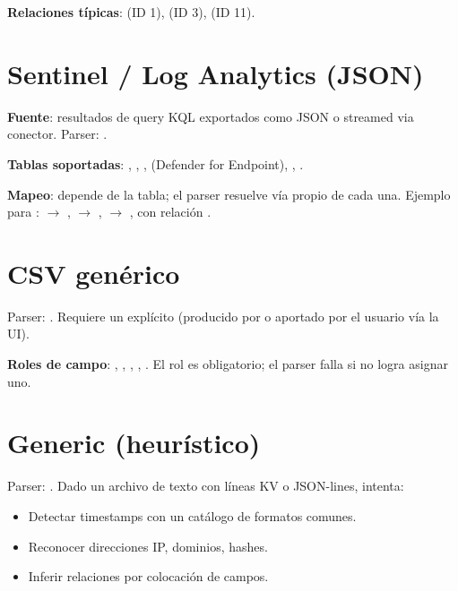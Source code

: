 \textbf{Relaciones típicas}: 
(ID 1),  (ID 3),
 (ID 11).

\section{Sentinel / Log Analytics (JSON)}

\textbf{Fuente}: resultados de query KQL exportados como JSON o
streamed via conector. Parser:
.

\textbf{Tablas soportadas}: ,
, , 
(Defender for Endpoint), , .

\textbf{Mapeo}: depende de la tabla; el parser resuelve vía
 propio de cada una. Ejemplo para
:  $\to$ ,
 $\to$ ,  $\to$
, con relación .

\section{CSV genérico}

Parser: . Requiere un
 explícito (producido por
 o aportado por el usuario vía la UI).

\textbf{Roles de campo}: , , ,
, . El rol  es obligatorio; el
parser falla si no logra asignar uno.

\section{Generic (heurístico)}

Parser: . Dado un
archivo de texto con líneas KV o JSON-lines, intenta:

\begin{itemize}
    \item Detectar timestamps con un catálogo de formatos comunes.
    \item Reconocer direcciones IP, dominios, hashes.
    \item Inferir relaciones por colocación de campos.
\end{itemize}

